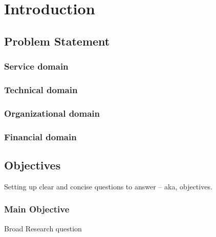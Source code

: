 \documentclass[15pt]{article}
\begin{document}




\tableofcontents
\newpage



\section{Introduction}
  \subsection{Problem Statement}
    \subsubsection{Service domain}
    \subsubsection{Technical domain}
    \subsubsection{Organizational domain}
    \subsubsection{Financial domain}
  \subsection{Objectives}
  	Setting up clear and concise questions to answer -- aka, objectives.
  	\subsubsection{Main Objective}
  	Broad Research question
\end{document}
